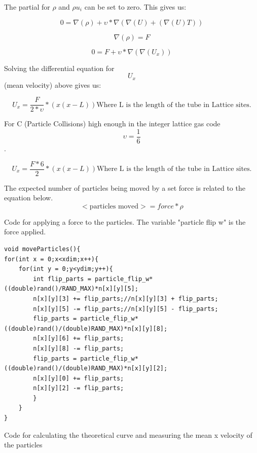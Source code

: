 \documentclass{article}
\begin{document}
The partial for $\rho$ and $\rho u_{i}$ can be set to zero.
This gives us:

\begin{equation}
0 = \nabla(\rho) + \upsilon *\nabla(\nabla(U)+(\nabla(U)T))
\end{equation}


$$ \nabla(\rho) = F$$ 

\begin{equation}
0 = F + \upsilon *\nabla(\nabla(U_x))
\end{equation}

Solving the differential equation for $$U_x$$ (mean velocity) above gives us:

\begin{equation}
U_x =\frac{F}{2*\upsilon}*(x(x-L)) \textrm{Where L is the length of the tube in Lattice sites.}
\end{equation}

For C (Particle Collisions) high enough in the integer lattice gas code $$\upsilon = \frac{1}{6}$$.

\begin{equation}
U_x =\frac{F*6}{2}*(x(x-L)) \textrm{Where L is the length of the tube in Lattice sites.}
\end{equation}

The expected number of particles being moved by a set force is related to the equation below.  
\begin{equation}
<\textrm{particles moved}> = force*\rho
\end{equation}


\vspace{5mm}
Code for applying a force to the particles. The variable "particle flip w" is the force applied.
\begin{verbatim}
void moveParticles(){
for(int x = 0;x<xdim;x++){
	for(int y = 0;y<ydim;y++){
		int flip_parts = particle_flip_w*((double)rand()/RAND_MAX)*n[x][y][5];
		n[x][y][3] += flip_parts;//n[x][y][3] + flip_parts;
		n[x][y][5] -= flip_parts;//n[x][y][5] - flip_parts;
		flip_parts = particle_flip_w*((double)rand()/(double)RAND_MAX)*n[x][y][8];
		n[x][y][6] += flip_parts;
		n[x][y][8] -= flip_parts;
		flip_parts = particle_flip_w*((double)rand()/(double)RAND_MAX)*n[x][y][2];
		n[x][y][0] += flip_parts;
		n[x][y][2] -= flip_parts;
		}
	}
}
 \end{verbatim}
\vspace{5mm}

Code for calculating the theoretical curve and measuring the mean x velocity of the particles
\end{document}
